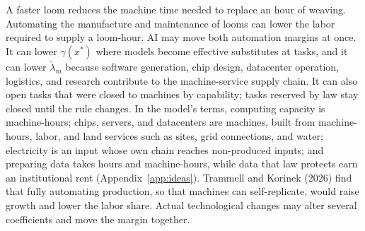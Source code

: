 \documentclass[12pt]{article}
\theoremstyle{plain}
\theoremstyle{definition}
\theoremstyle{remark}
\begin{document}
A faster loom reduces the machine time needed to replace an hour of weaving. Automating the manufacture and maintenance of looms can lower the labor required to supply a loom-hour.
AI may move both automation margins at once. It can lower $\gamma(x^*)$ where models become effective substitutes at tasks, and it can lower $\widetilde{\lambda}_m$ because software generation, chip design, datacenter operation, logistics, and research contribute to the machine-service supply chain.
It can also open tasks that were closed to machines by capability; tasks reserved by law stay closed until the rule changes. In the model's terms, computing capacity is machine-hours; chips, servers, and datacenters are machines, built from machine-hours, labor, and land services such as sites, grid connections, and water; electricity is an input whose own chain reaches non-produced inputs; and preparing data takes hours and machine-hours, while data that law protects earn an institutional rent (Appendix~\ref{app:ideas}).
Trammell and Korinek (2026) find that fully automating production, so that machines can self-replicate, would raise growth and lower the labor share.
Actual technological changes may alter several coefficients and move the margin together.
\end{document}
